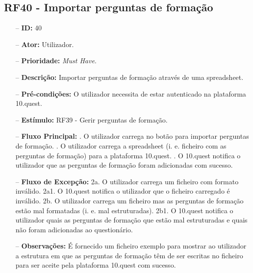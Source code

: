 \newpage

\subsection{RF40 - Importar perguntas de formação}
\begin{itemize}
	\item[--] \textbf{ID:} 40
	\item[--]  \textbf{Ator:} Utilizador.
	\item[--]  \textbf{Prioridade:} \textit{Must Have}.
	\item[--]  \textbf{Descrição:} Importar perguntas de formação através de uma spreadsheet. 
	\item[--]  \textbf{Pré-condições:} O utilizador necessita de estar autenticado na plataforma 10.quest.
	\item[--]  \textbf{Estímulo:}  RF39 - Gerir perguntas de formação.
	\item[--]  \textbf{Fluxo Principal:} 
		. O utilizador carrega no botão para importar perguntas de formação.
		. O utilizador carrega a spreadsheet (i. e. ficheiro com as perguntas de formação) para a plataforma 10.quest.
		. O 10.quest notifica o utilizador que as perguntas de formação foram adicionadas com sucesso.
	\item[--]  \textbf{Fluxo de Excepção:} 
		\subitem 2a. O utilizador carrega um ficheiro com formato inválido.
		\subitem 2a1. O 10.quest notifica o utilizador que o ficheiro carregado é inválido.
		\subitem 2b. O utilizador carrega um ficheiro mas as perguntas de formação estão mal formatadas (i. e. mal estruturadas).
		\subitem 2b1. O 10.quest notifica o utilizador quais as perguntas de formação que estão mal estruturadas e quais não foram adicionadas ao questionário.
		\begin{comment}
		\subitem 3a. O 10.quest não consegue efetuar o pedido à API do TCG devido a uma falha na conexão.
		\subitem 3a1. O 10.quest notifica o utilizador que ocorreu uma falha na conexão.
		\subitem 3b. O serviço do TCG (API) está indisponível.
		\subitem 3b1. O 10.quest notifica o utilizador que o serviço do TCG está temporariamente indisponível. 
		\end{comment}
	\item[--]  \textbf{Observações:} É fornecido um ficheiro exemplo para mostrar ao utilizador a estrutura em que as perguntas de formação  têm de ser escritas no ficheiro para ser aceite pela plataforma 10.quest com sucesso.
\end{itemize}
\newpage

